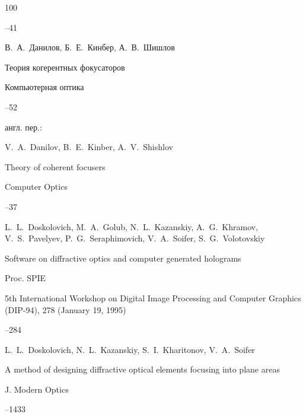 \begin{thebibliography}{100}

--41




\by В.~А.~Данилов, Б.~Е.~Кинбер, А.~В.~Шишлов

\paper Теория когерентных фокусаторов

\jour Компьютерная оптика



--52

\transl англ. пер.:~

\by V.~A.~Danilov, B.~E.~Kinber, A.~V.~Shishlov

\paper Theory of coherent focusers 	

\jour Computer Optics




--37




\by  L.~L.~Doskolovich, M.~A.~Golub, N.~L.~Kazanskiy, A.~G.~Khramov, V.~S.~Pavelyev, P.~G.~Seraphimovich, V.~A.~Soifer, S.~G.~Volotovskiy

\paper Software on diffractive optics and computer generated holograms

\jour Proc. SPIE



\volinfo 5th International Workshop on Digital Image Processing and Computer Graphics (DIP-94), 278 (January 19, 1995)

--284





\by  L.~L.~Doskolovich, N.~L.~Kazanskiy, S.~I.~Kharitonov, V.~A.~Soifer

\paper A method of designing diffractive optical elements focusing into plane areas

\jour J. Modern Optics




--1433





\end{thebibliography}
